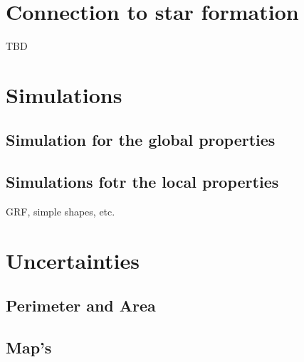 \section{Connection to star formation}

TBD

\section{Simulations}

\subsection{Simulation for the global properties}

\subsection{Simulations fotr the local properties}

GRF, simple shapes, etc.

\section{Uncertainties}

\subsection{Perimeter and Area}

\subsection{Map's}
